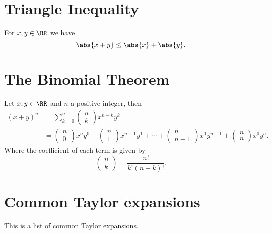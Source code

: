 \documentclass[12pt, a4paper]{article}
\begin{document}
\section{Triangle Inequality}

\begin{theorem}
    For \(x,y \in \RR\) we have 
    \[\abs{x+y} \leq \abs{x}+\abs{y}.\]
\end{theorem}

\section{The Binomial Theorem}

\begin{theorem}
    Let \(x,y \in \RR\) and \(n\) a positive integer, then
    \[\begin{aligned}
        (x+y)^n &= \sum_{k=0}^{n} \begin{pmatrix} n \\k \end{pmatrix} x^{n-k} y^k \\
                &= \begin{pmatrix} n \\ 0 \end{pmatrix} x^n y^0 +\begin{pmatrix} n \\1 \end{pmatrix} x^{n-1} y^1 +\cdots + \begin{pmatrix} n \\ n-1 \end{pmatrix} x^1 y^{n-1} +\begin{pmatrix} n \\n \end{pmatrix} x^0 y^n.
    \end{aligned}\]
    Where the coefficient of each term is given by
    \[\begin{pmatrix} n \\k \end{pmatrix} = \frac{n!}{k!(n-k)!}.\]
\end{theorem}

\section{Common Taylor expansions}

This is a list of common Taylor expansions.
\end{document}
